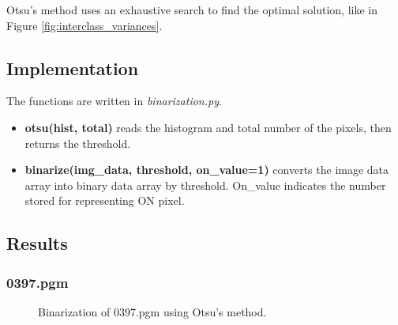 \documentclass[paper=a4, fontsize=11pt]{scrartcl}
\numberwithin{equation}{section}		%
\numberwithin{figure}{section}			%
\numberwithin{table}{section}				%
\begin{document}
Otsu's method uses an exhaustive search to find the optimal solution, like in Figure \ref{fig:interclass_variances}. 

\subsection{Implementation}

The functions are written in \emph{binarization.py}.

\begin{itemize}
\item \textbf{ otsu(hist, total) } reads the histogram and total number of the pixels, then returns the threshold.
\item \textbf{ binarize(img\_data, threshold, on\_value=1) } converts the image data array into binary data array by threshold.
On\_value indicates the number stored for representing ON pixel.
\end{itemize}

\subsection{Results}

\subsubsection{0397.pgm}

\begin{figure}
\centering
{}
\caption{Binarization of 0397.pgm using Otsu's method.}\label{fig:binary:01}
\end{figure}
\end{document}
